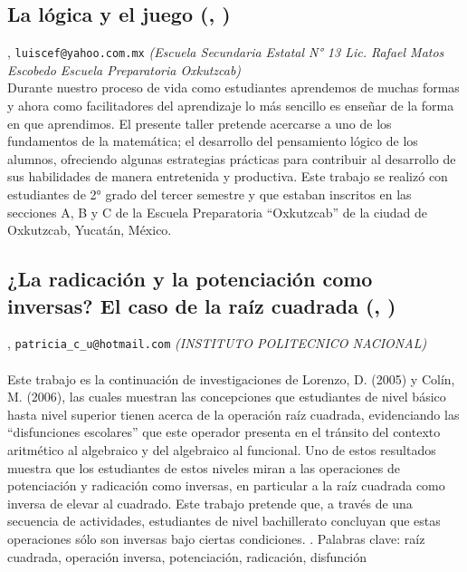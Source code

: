 \subsection{\sffamily La lógica y el juego {\footnotesize (, )}} \label{reg-517} 
, {\tt luiscef@yahoo.com.mx}  {\slshape (Escuela Secundaria Estatal N° 13 Lic. Rafael Matos Escobedo Escuela Preparatoria Oxkutzcab)}\\
          \noindent Durante nuestro proceso de vida como estudiantes aprendemos de muchas formas y ahora como facilitadores del aprendizaje lo más sencillo es enseñar de la forma en que aprendimos. El presente taller pretende acercarse a uno de los fundamentos de la matemática; el desarrollo del pensamiento lógico de los alumnos, ofreciendo algunas estrategias prácticas para contribuir al desarrollo de sus habilidades de manera entretenida y productiva. Este trabajo se realizó con estudiantes de 2° grado del tercer semestre y que estaban inscritos en las secciones A, B y C de la Escuela Preparatoria “Oxkutzcab” de la ciudad de Oxkutzcab, Yucatán, México.
\subsection{\sffamily ¿La radicación y la potenciación como inversas? El caso de la raíz cuadrada {\footnotesize (, )}} \label{reg-1592} 
, {\tt patricia_c_u@hotmail.com}  {\slshape (INSTITUTO POLITECNICO NACIONAL)}\\
\\
\noindent Este trabajo es la continuación de investigaciones de Lorenzo, D. (2005) y Colín, M. (2006), las cuales muestran las concepciones que estudiantes de nivel básico hasta nivel superior tienen acerca de la operación raíz cuadrada, evidenciando las “disfunciones escolares” que este operador presenta en el tránsito del contexto aritmético al algebraico y del algebraico al funcional. Uno de estos resultados muestra que los estudiantes de estos niveles miran a las operaciones de potenciación y radicación como inversas, en particular a la raíz cuadrada como inversa de elevar al cuadrado. Este trabajo pretende que, a través de una secuencia de actividades, estudiantes de nivel bachillerato concluyan que estas operaciones sólo son inversas bajo ciertas condiciones. . Palabras clave: raíz cuadrada, operación inversa, potenciación, radicación, disfunción
